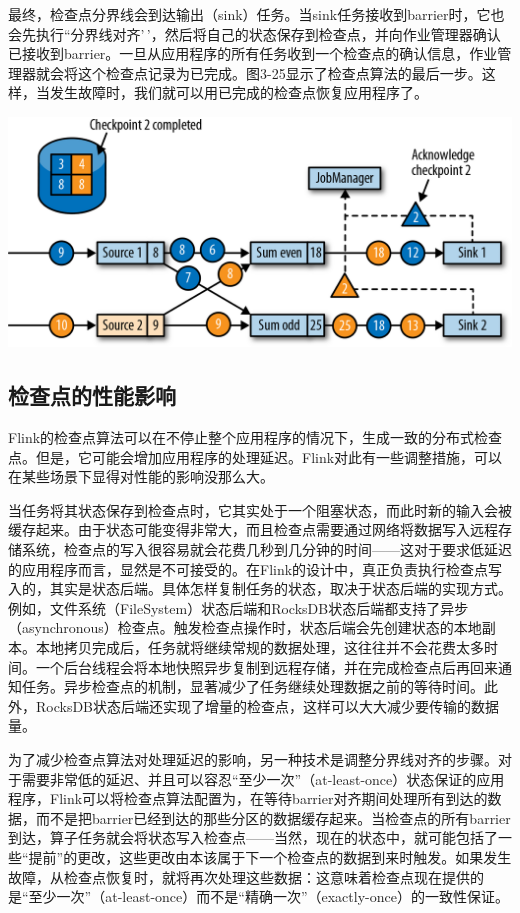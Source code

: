 \documentclass[cn,11pt,chinese]{elegantbook}
\begin{document}
最终，检查点分界线会到达输出（sink）任务。当sink任务接收到barrier时，它也会先执行``分界线对齐'\,'，然后将自己的状态保存到检查点，并向作业管理器确认已接收到barrier。一旦从应用程序的所有任务收到一个检查点的确认信息，作业管理器就会将这个检查点记录为已完成。图3-25显示了检查点算法的最后一步。这样，当发生故障时，我们就可以用已完成的检查点恢复应用程序了。

\includegraphics{images/spaf_0325.png}

\hypertarget{ux68c0ux67e5ux70b9ux7684ux6027ux80fdux5f71ux54cd}{%
\subsection{检查点的性能影响}\label{ux68c0ux67e5ux70b9ux7684ux6027ux80fdux5f71ux54cd}}

Flink的检查点算法可以在不停止整个应用程序的情况下，生成一致的分布式检查点。但是，它可能会增加应用程序的处理延迟。Flink对此有一些调整措施，可以在某些场景下显得对性能的影响没那么大。

当任务将其状态保存到检查点时，它其实处于一个阻塞状态，而此时新的输入会被缓存起来。由于状态可能变得非常大，而且检查点需要通过网络将数据写入远程存储系统，检查点的写入很容易就会花费几秒到几分钟的时间------这对于要求低延迟的应用程序而言，显然是不可接受的。在Flink的设计中，真正负责执行检查点写入的，其实是状态后端。具体怎样复制任务的状态，取决于状态后端的实现方式。例如，文件系统（FileSystem）状态后端和RocksDB状态后端都支持了异步（asynchronous）检查点。触发检查点操作时，状态后端会先创建状态的本地副本。本地拷贝完成后，任务就将继续常规的数据处理，这往往并不会花费太多时间。一个后台线程会将本地快照异步复制到远程存储，并在完成检查点后再回来通知任务。异步检查点的机制，显著减少了任务继续处理数据之前的等待时间。此外，RocksDB状态后端还实现了增量的检查点，这样可以大大减少要传输的数据量。

为了减少检查点算法对处理延迟的影响，另一种技术是调整分界线对齐的步骤。对于需要非常低的延迟、并且可以容忍``至少一次''（at-least-once）状态保证的应用程序，Flink可以将检查点算法配置为，在等待barrier对齐期间处理所有到达的数据，而不是把barrier已经到达的那些分区的数据缓存起来。当检查点的所有barrier到达，算子任务就会将状态写入检查点------当然，现在的状态中，就可能包括了一些``提前''的更改，这些更改由本该属于下一个检查点的数据到来时触发。如果发生故障，从检查点恢复时，就将再次处理这些数据：这意味着检查点现在提供的是``至少一次''（at-least-once）而不是``精确一次''（exactly-once）的一致性保证。
\end{document}
